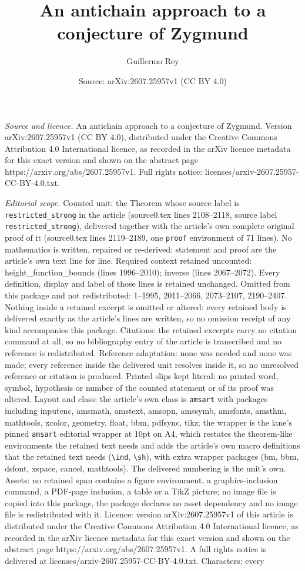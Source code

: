 \documentclass[10pt,a4paper]{amsart}
\title[An antichain approach to a conjecture of Zygmund]{An antichain approach to a conjecture of Zygmund}
\author{Guillermo Rey}
\date{Source: arXiv:2607.25957v1 (CC BY 4.0)}
\begin{document}
\maketitle

\noindent\emph{Source and licence.} An antichain approach to a conjecture of Zygmund. Version arXiv:2607.25957v1 (CC BY 4.0), distributed under the Creative Commons Attribution 4.0 International licence, as recorded in the arXiv licence metadata for this exact version and shown on the abstract page https://arxiv.org/abs/2607.25957v1. Full rights notice: licenses/arxiv-2607.25957-CC-BY-4.0.txt.\par\smallskip

\noindent\textit{Editorial scope.} Counted unit: the Theorem whose source label is \texttt{restricted\_strong} in the article (source0.tex lines 2108--2118, source label \texttt{restricted\_strong}), delivered together with the article's own complete original proof of it (source0.tex lines 2119--2189, one \texttt{proof} environment of 71 lines). No mathematics is written, repaired or re-derived: statement and proof are the article's own text line for line. Required context retained uncounted: height\_function\_bounds (lines 1996--2010); inverse (lines 2067--2072). Every definition, display and label of those lines is retained unchanged. Omitted from this package and not redistributed: 1--1995, 2011--2066, 2073--2107, 2190--2407. Nothing inside a retained excerpt is omitted or altered: every retained body is delivered exactly as the article's lines are written, so no omission receipt of any kind accompanies this package. Citations: the retained excerpts carry no citation command at all, so no bibliography entry of the article is transcribed and no reference is redistributed. Reference adaptation: none was needed and none was made; every reference inside the delivered unit resolves inside it, so no unresolved reference or citation is produced. Printed slips kept literal: no printed word, symbol, hypothesis or number of the counted statement or of its proof was altered. Layout and class: the article's own class is \texttt{amsart} with packages including inputenc, amsmath, amstext, amsopn, amssymb, amsfonts, amsthm, mathtools, xcolor, geometry, float, bbm, pdfsync, tikz; the wrapper is the lane's pinned \texttt{amsart} editorial wrapper at 10pt on A4, which restates the theorem-like environments the retained text needs and adds the article's own macro definitions that the retained text needs (\texttt{\textbackslash ind}, \texttt{\textbackslash sh}), with extra wrapper packages (bm, bbm, dsfont, xspace, cancel, mathtools). The delivered numbering is the unit's own. Assets: no retained span contains a figure environment, a graphics-inclusion command, a PDF-page inclusion, a table or a TikZ picture; no image file is copied into this package, the package declares no asset dependency and no image file is redistributed with it. Licence: version arXiv:2607.25957v1 of this article is distributed under the Creative Commons Attribution 4.0 International licence, as recorded in the arXiv licence metadata for this exact version and shown on the abstract page https://arxiv.org/abs/2607.25957v1. A full rights notice is delivered at licenses/arxiv-2607.25957-CC-BY-4.0.txt. Characters: every 
\end{document}
